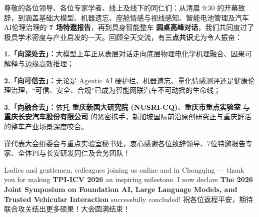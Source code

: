 \documentclass[12pt,a4paper]{article}
\begin{document}
\begin{tcolorbox}[
  enhanced, colback=slate100, colframe=slate700, arc=1.4mm, boxrule=0.8pt,
  left=3.4mm, right=3.4mm, top=1.9mm, bottom=1.9mm,
  title={\fontsize{10.6}{13}\selectfont\bfseries 【版本 B · 现场备选】若院领导委托主持人直接代表组委会作闭幕总结},
  colbacktitle=slate700, coltitle=white, toptitle=1.25mm, bottomtitle=1.25mm
]
\fontsize{10.8}{15.4}\selectfont
尊敬的各位领导、各位专家学者、线上及线下的同仁们：从清晨 9:30 的开幕致辞，到涵盖基础大模型、机器遗忘、座舱情感与视线感知、智能电池管理及汽车AI伦理治理的 \textbf{7 场特邀报告}，再到具身智能整车 \textbf{圆桌高峰对话}，我们共同度过了极具学术密度与产业启发的一天。回顾全天交流，有\textbf{三点共识}尤为令人振奋：\par
\textbf{1.「向深处去」：}大模型上车正从表层对话走向底层物理电化学机理融合、因果可解释与边缘高效推理；\par
\textbf{2.「向可信去」：}无论是 Agentic AI 硬护栏、机器遗忘、量化情感测评还是健康伦理治理，“可信、安全、合规”已成为智能网联汽车不可动摇的生命线；\par
\textbf{3.「向融合去」：}依托 \textbf{重庆新国大研究院 (NUSRI-CQ)}、\textbf{重庆市重点实验室} 与 \textbf{重庆长安汽车股份有限公司} 的紧密携手，新加坡国际前沿原创研究正与重庆鲜活的整车产业场景深度咬合。\par
谨代表大会组委会与重点实验室秘书处，衷心感谢各位致辞领导、7位特邀报告专家、全体PI与长安研发同仁及会务团队！\par
Ladies and gentlemen, colleagues joining us online and in Chongqing — thank you for making \textbf{TPI-ICV 2026} an inspiring milestone. I now declare \textbf{The 2026 Joint Symposium on Foundation AI, Large Language Models, and Trusted Vehicular Interaction} successfully concluded! 祝各位返程平安，期待联合攻关结出更多硕果！大会圆满结束！
\end{tcolorbox}
\end{document}
